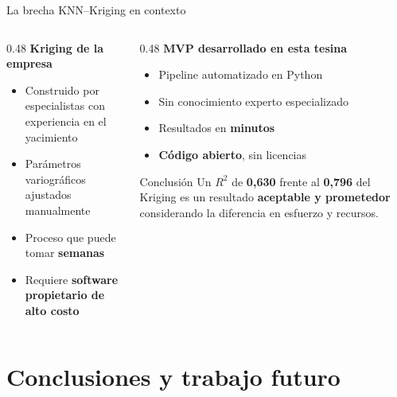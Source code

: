 \documentclass[10pt, aspectratio=169]{beamer}
\newcommand{\hl}[1]{\textcolor{accent}{\textbf{#1}}}
\newcommand{\emp}[1]{\textcolor{primary}{\textbf{#1}}}
\begin{document}
	\begin{frame}{La brecha KNN–Kriging en contexto}
		\begin{columns}[T]
			\begin{column}{0.48\textwidth}
				\textbf{Kriging de la empresa}\\[4pt]
				\begin{itemize}
					\item Construido por especialistas con experiencia en el yacimiento
					\item Parámetros variográficos ajustados manualmente
					\item Proceso que puede tomar \emp{semanas}
					\item Requiere \emp{software propietario de alto costo}
				\end{itemize}
			\end{column}
			\begin{column}{0.48\textwidth}
				\textbf{MVP desarrollado en esta tesina}\\[4pt]
				\begin{itemize}
					\item Pipeline automatizado en Python
					\item Sin conocimiento experto especializado
					\item Resultados en \hl{minutos}
					\item \hl{Código abierto}, sin licencias
				\end{itemize}
				\vspace{10pt}
				\begin{alertblock}{Conclusión}
					Un $R^2$ de \textbf{0,630} frente al \textbf{0,796}
					del Kriging es un resultado \hl{aceptable
						y prometedor} considerando la diferencia
					en esfuerzo y recursos.
				\end{alertblock}
			\end{column}
		\end{columns}
	\end{frame}
	
	\section{Conclusiones y trabajo futuro}
	
\end{document}
